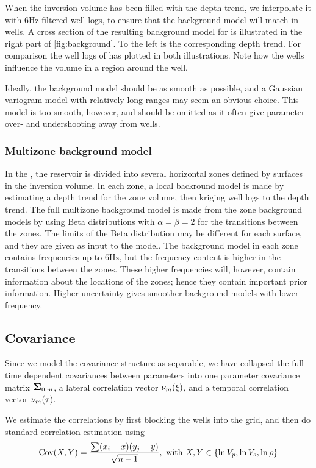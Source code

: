 When the inversion volume has been filled with the depth trend, we
interpolate it with 6Hz filtered well logs, to ensure that the
background model will match in wells. A cross section of the resulting
background model for \vp is illustrated in the right part of
\autoref{fig:background}. To the left is the corresponding depth
trend. For comparison the well logs of \vp has plotted in both
illustrations. Note how the wells influence the volume in a region
around the well.

Ideally, the background model should be as smooth as possible,
and a Gaussian variogram model with relatively long ranges may seem an
obvious choice. This model is too smooth, however, and should be
omitted as it often give parameter over- and undershooting away
from wells.

\subsubsection{Multizone background model}
In the , the reservoir is divided into several horizontal zones defined by surfaces in the inversion volume. In each zone, a local backround model is made by estimating a depth trend for the zone volume, then kriging well logs to the depth trend. The full multizone background model is made from the zone background models by using Beta distributions with $\alpha = \beta =2$ for the transitions between the zones. The limits of the Beta distribution may be different for each surface, and they are given as input to the model. The background model in each zone contains frequencies up to 6Hz, but the frequency content is higher in the transitions between the zones. These higher frequencies will, however, contain information about the locations of the zones; hence they contain important prior information. Higher uncertainty gives smoother background models with lower frequency.

\subsection{Covariance}
\label{sec:correstimp}

Since we model the covariance structure as separable, we have
collapsed the full time dependent covariances between parameters into
one parameter covariance matrix $\mbox{\large\ensuremath{\boldsymbol{\Sigma}}}_{0,m}$, a lateral correlation
vector $\nu_m(\xi)$, and a temporal correlation vector
$\nu_m(\tau)$.

We estimate the correlations by first blocking the wells into the
grid, and then do standard correlation estimation using
\begin{equation}
\text{Cov}(X,Y) = \frac{\sum(x_i - \bar{x})(y_j - \bar{y})}{\sqrt{n - 1}},\
  \text{with}\ X,Y\in\{\ln V_p, \ln V_s, \ln\rho\}
\end{equation}

